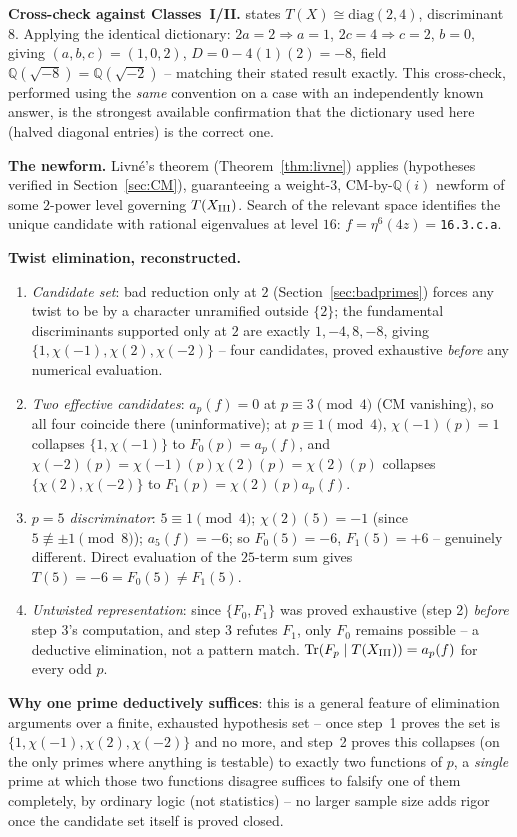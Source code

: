 \documentclass[11pt]{amsart}
\theoremstyle{definition}
\newcommand{\Q}{\mathbb{Q}}
\DeclareMathOperator{\Tr}{Tr}
\begin{document}
\textbf{Cross-check against Classes~I/II.} \cite{ClassesI_II} states
$T(X)\cong\mathrm{diag}(2,4)$, discriminant $8$. Applying the identical
dictionary: $2a=2\Rightarrow a=1$, $2c=4\Rightarrow c=2$, $b=0$, giving
$(a,b,c)=(1,0,2)$, $D=0-4(1)(2)=-8$, field $\Q(\sqrt{-8})=\Q(\sqrt{-2})$
-- matching their stated result exactly. This cross-check, performed
using the \emph{same} convention on a case with an independently known
answer, is the strongest available confirmation that the dictionary used
here (halved diagonal entries) is the correct one.

\textbf{The newform.} Livn\'e's theorem (Theorem~\ref{thm:livne}) applies
(hypotheses verified in Section~\ref{sec:CM}), guaranteeing a weight-$3$,
CM-by-$\Q(i)$ newform of some $2$-power level governing $T(X_{\rm III})$.
Search of the relevant space identifies the unique candidate with
rational eigenvalues at level $16$: $f=\eta^6(4z)=$\texttt{16.3.c.a}.

\textbf{Twist elimination, reconstructed.}
\begin{enumerate}
\item \emph{Candidate set}: bad reduction only at $2$
(Section~\ref{sec:badprimes}) forces any twist to be by a character
unramified outside $\{2\}$; the fundamental discriminants supported only
at $2$ are exactly $1,-4,8,-8$, giving $\{1,\chi(-1),\chi(2),\chi(-2)\}$
-- four candidates, proved exhaustive \emph{before} any numerical
evaluation.
\item \emph{Two effective candidates}: $a_p(f)=0$ at $p\equiv3\pmod4$
(CM vanishing), so all four coincide there (uninformative); at
$p\equiv1\pmod4$, $\chi(-1)(p)=1$ collapses $\{1,\chi(-1)\}$ to
$F_0(p)=a_p(f)$, and $\chi(-2)(p)=\chi(-1)(p)\chi(2)(p)=\chi(2)(p)$
collapses $\{\chi(2),\chi(-2)\}$ to $F_1(p)=\chi(2)(p)a_p(f)$.
\item \emph{$p=5$ discriminator}: $5\equiv1\pmod4$; $\chi(2)(5)=-1$
(since $5\not\equiv\pm1\pmod8$); $a_5(f)=-6$; so $F_0(5)=-6$,
$F_1(5)=+6$ -- genuinely different. Direct evaluation of the $25$-term
sum gives $T(5)=-6=F_0(5)\neq F_1(5)$.
\item \emph{Untwisted representation}: since $\{F_0,F_1\}$ was proved
exhaustive (step 2) \emph{before} step 3's computation, and step 3
refutes $F_1$, only $F_0$ remains possible -- a deductive elimination,
not a pattern match. $\Tr(F_p\mid T(X_{\rm III}))=a_p(f)$ for every odd
$p$.
\end{enumerate}
\textbf{Why one prime deductively suffices}: this is a general feature of
elimination arguments over a finite, exhausted hypothesis set -- once
step~1 proves the set is $\{1,\chi(-1),\chi(2),\chi(-2)\}$ and no more,
and step~2 proves this collapses (on the only primes where anything is
testable) to exactly two functions of $p$, a \emph{single} prime at which
those two functions disagree suffices to falsify one of them completely,
by ordinary logic (not statistics) -- no larger sample size adds rigor
once the candidate set itself is proved closed.
\end{document}
